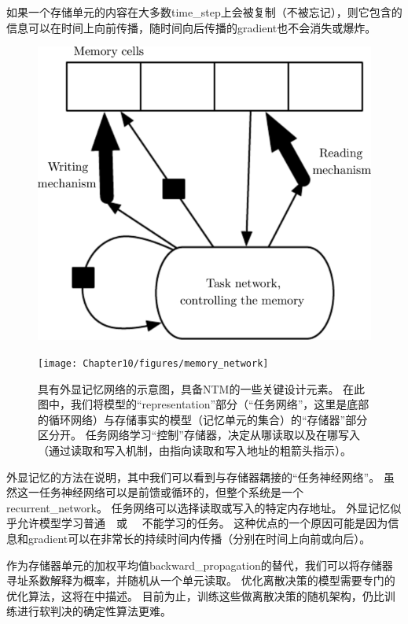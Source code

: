 如果一个存储单元的内容在大多数\gls{time_step}上会被复制（不被忘记），则它包含的信息可以在时间上向前传播，随时间向后传播的\gls{gradient}也不会消失或爆炸。

\begin{figure}[!htb]
\ifOpenSource
\centerline{\includegraphics[scale=0.5]{images/106.png}}
\else
\centerline{\texttt{[image: Chapter10/figures/memory\_network]}}
\fi
\caption{具有外显记忆网络的示意图，具备\gls{NTM}的一些关键设计元素。
在此图中，我们将模型的``\gls{representation}''部分（``任务网络''，这里是底部的循环网络）与存储事实的模型（记忆单元的集合）的``存储器''部分区分开。
任务网络学习``控制''存储器，决定从哪读取以及在哪写入（通过读取和写入机制，由指向读取和写入地址的粗箭头指示）。
}
\label{fig:chap10_memory_network}
\end{figure}

外显记忆的方法在说明，其中我们可以看到与存储器耦接的``任务神经网络''。
虽然这一任务神经网络可以是前馈或循环的，但整个系统是一个\gls{recurrent_network}。
任务网络可以选择读取或写入的特定内存地址。
外显记忆似乎允许模型学习普通~~或~ ~不能学习的任务。
这种优点的一个原因可能是因为信息和\gls{gradient}可以在非常长的持续时间内传播（分别在时间上向前或向后）。


作为存储器单元的加权平均值\gls{backward_propagation}的替代，我们可以将存储器寻址系数解释为概率，并随机从一个单元读取\citep{Zaremba+Sutskever-arxiv2015}。
优化离散决策的模型需要专门的优化算法，这将在中描述。
目前为止，训练这些做离散决策的随机架构，仍比训练进行软判决的确定性算法更难。

